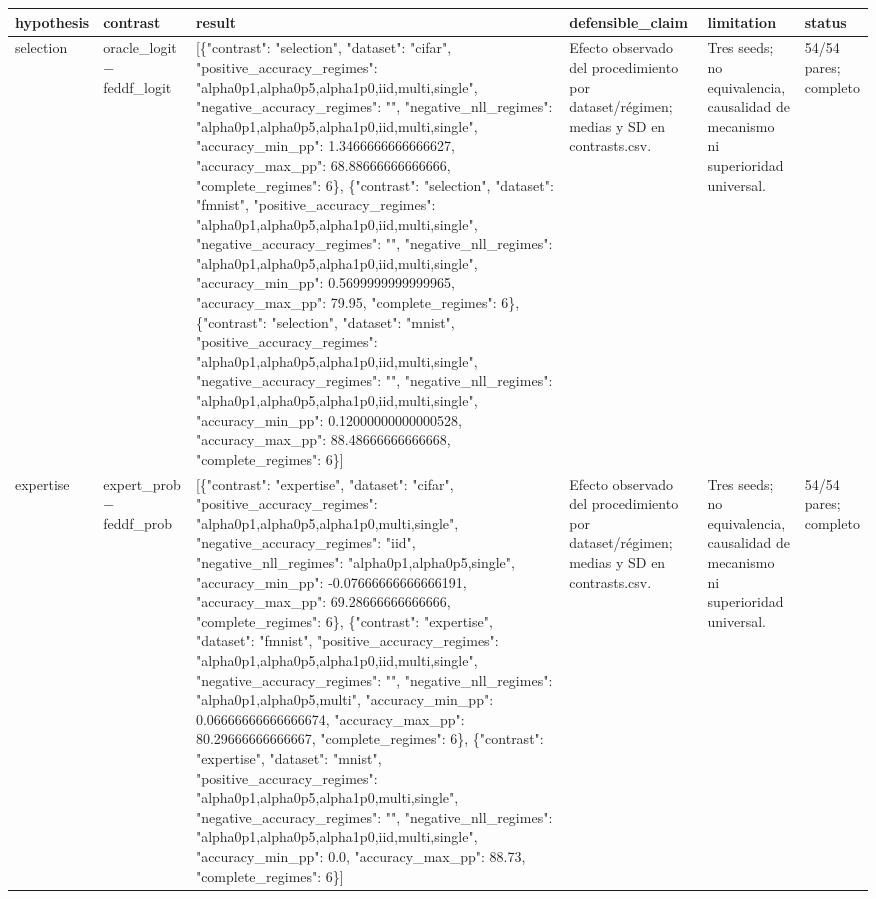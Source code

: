 \begin{tabular}{llllll}
\toprule
hypothesis & contrast & result & defensible\_claim & limitation & status \\
\midrule
selection & oracle\_logit − feddf\_logit & [\{"contrast": "selection", "dataset": "cifar", "positive\_accuracy\_regimes": "alpha0p1,alpha0p5,alpha1p0,iid,multi,single", "negative\_accuracy\_regimes": "", "negative\_nll\_regimes": "alpha0p1,alpha0p5,alpha1p0,iid,multi,single", "accuracy\_min\_pp": 1.3466666666666627, "accuracy\_max\_pp": 68.88666666666666, "complete\_regimes": 6\}, \{"contrast": "selection", "dataset": "fmnist", "positive\_accuracy\_regimes": "alpha0p1,alpha0p5,alpha1p0,iid,multi,single", "negative\_accuracy\_regimes": "", "negative\_nll\_regimes": "alpha0p1,alpha0p5,alpha1p0,iid,multi,single", "accuracy\_min\_pp": 0.5699999999999965, "accuracy\_max\_pp": 79.95, "complete\_regimes": 6\}, \{"contrast": "selection", "dataset": "mnist", "positive\_accuracy\_regimes": "alpha0p1,alpha0p5,alpha1p0,iid,multi,single", "negative\_accuracy\_regimes": "", "negative\_nll\_regimes": "alpha0p1,alpha0p5,alpha1p0,iid,multi,single", "accuracy\_min\_pp": 0.12000000000000528, "accuracy\_max\_pp": 88.48666666666668, "complete\_regimes": 6\}] & Efecto observado del procedimiento por dataset/régimen; medias y SD en contrasts.csv. & Tres seeds; no equivalencia, causalidad de mecanismo ni superioridad universal. & 54/54 pares; completo \\
expertise & expert\_prob − feddf\_prob & [\{"contrast": "expertise", "dataset": "cifar", "positive\_accuracy\_regimes": "alpha0p1,alpha0p5,alpha1p0,multi,single", "negative\_accuracy\_regimes": "iid", "negative\_nll\_regimes": "alpha0p1,alpha0p5,single", "accuracy\_min\_pp": -0.07666666666666191, "accuracy\_max\_pp": 69.28666666666666, "complete\_regimes": 6\}, \{"contrast": "expertise", "dataset": "fmnist", "positive\_accuracy\_regimes": "alpha0p1,alpha0p5,alpha1p0,iid,multi,single", "negative\_accuracy\_regimes": "", "negative\_nll\_regimes": "alpha0p1,alpha0p5,multi", "accuracy\_min\_pp": 0.06666666666666674, "accuracy\_max\_pp": 80.29666666666667, "complete\_regimes": 6\}, \{"contrast": "expertise", "dataset": "mnist", "positive\_accuracy\_regimes": "alpha0p1,alpha0p5,alpha1p0,multi,single", "negative\_accuracy\_regimes": "", "negative\_nll\_regimes": "alpha0p1,alpha0p5,alpha1p0,iid,multi,single", "accuracy\_min\_pp": 0.0, "accuracy\_max\_pp": 88.73, "complete\_regimes": 6\}] & Efecto observado del procedimiento por dataset/régimen; medias y SD en contrasts.csv. & Tres seeds; no equivalencia, causalidad de mecanismo ni superioridad universal. & 54/54 pares; completo \\

\end{tabular}
